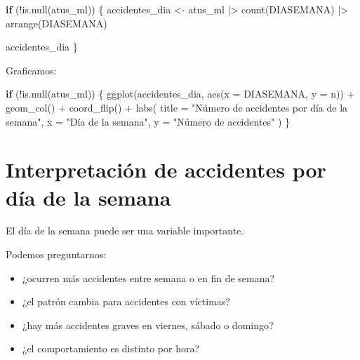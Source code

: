 \documentclass[
  11pt,
  letterpaper,
]{book}
\newenvironment{Shaded}{\begin{snugshade}}{\end{snugshade}}
\newcommand{\AttributeTok}[1]{\textcolor[rgb]{0.40,0.45,0.13}{#1}}
\newcommand{\ControlFlowTok}[1]{\textcolor[rgb]{0.00,0.23,0.31}{\textbf{#1}}}
\newcommand{\FunctionTok}[1]{\textcolor[rgb]{0.28,0.35,0.67}{#1}}
\newcommand{\NormalTok}[1]{\textcolor[rgb]{0.00,0.23,0.31}{#1}}
\newcommand{\OtherTok}[1]{\textcolor[rgb]{0.00,0.23,0.31}{#1}}
\newcommand{\SpecialCharTok}[1]{\textcolor[rgb]{0.37,0.37,0.37}{#1}}
\newcommand{\StringTok}[1]{\textcolor[rgb]{0.13,0.47,0.30}{#1}}
\providecommand{\tightlist}{%
  \setlength{\itemsep}{0pt}\setlength{\parskip}{0pt}}
\begin{document}
\begin{Shaded}
\begin{Highlighting}[]
\ControlFlowTok{if}\NormalTok{ (}\SpecialCharTok{!}\FunctionTok{is.null}\NormalTok{(atus\_ml)) \{}
\NormalTok{  accidentes\_dia }\OtherTok{\textless{}{-}}\NormalTok{ atus\_ml }\SpecialCharTok{|\textgreater{}}
    \FunctionTok{count}\NormalTok{(DIASEMANA) }\SpecialCharTok{|\textgreater{}}
    \FunctionTok{arrange}\NormalTok{(DIASEMANA)}

\NormalTok{  accidentes\_dia}
\NormalTok{\}}
\end{Highlighting}
\end{Shaded}

Graficamos:

\begin{Shaded}
\begin{Highlighting}[]
\ControlFlowTok{if}\NormalTok{ (}\SpecialCharTok{!}\FunctionTok{is.null}\NormalTok{(atus\_ml)) \{}
  \FunctionTok{ggplot}\NormalTok{(accidentes\_dia, }\FunctionTok{aes}\NormalTok{(}\AttributeTok{x =}\NormalTok{ DIASEMANA, }\AttributeTok{y =}\NormalTok{ n)) }\SpecialCharTok{+}
    \FunctionTok{geom\_col}\NormalTok{() }\SpecialCharTok{+}
    \FunctionTok{coord\_flip}\NormalTok{() }\SpecialCharTok{+}
    \FunctionTok{labs}\NormalTok{(}
      \AttributeTok{title =} \StringTok{"Número de accidentes por día de la semana"}\NormalTok{,}
      \AttributeTok{x =} \StringTok{"Día de la semana"}\NormalTok{,}
      \AttributeTok{y =} \StringTok{"Número de accidentes"}
\NormalTok{    )}
\NormalTok{\}}
\end{Highlighting}
\end{Shaded}

\section{Interpretación de accidentes por día de la
semana}\label{interpretaciuxf3n-de-accidentes-por-duxeda-de-la-semana}

El día de la semana puede ser una variable importante.

Podemos preguntarnos:

\begin{itemize}
\tightlist
\item
  ¿ocurren más accidentes entre semana o en fin de semana?
\item
  ¿el patrón cambia para accidentes con víctimas?
\item
  ¿hay más accidentes graves en viernes, sábado o domingo?
\item
  ¿el comportamiento es distinto por hora?
\end{itemize}
\end{document}
